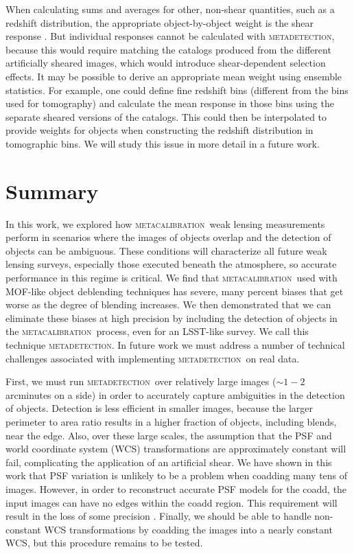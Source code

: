 \documentclass[fleqn,useAMS,usenatbib]{mnras}
\newcommand{\mcal}{\textsc{metacalibration}}
\newcommand{\mdet}{\textsc{metadetection}}
\begin{document}
When calculating sums and averages for other, non-shear quantities, such as a
redshift distribution, the appropriate object-by-object weight is the shear
response \citep{SheldonMcal2017}.  But individual responses cannot be
calculated with \mdet, because this would require matching the catalogs
produced from the different artificially sheared images, which would introduce
shear-dependent selection effects.  It may be possible to derive an appropriate
mean weight using ensemble statistics.  For example, one could define fine
redshift bins (different from the bins used for tomography) and calculate the
mean response in those bins using the separate sheared versions of the
catalogs. This could then be interpolated to provide weights for objects when
constructing the redshift distribution in tomographic bins.  We will study this
issue in more detail in a future work.


\section{Summary}\label{sec:conc}

In this work, we explored how \mcal\ weak lensing measurements perform in
scenarios where the images of objects overlap and the detection of objects can
be ambiguous. These conditions will characterize all future weak lensing
surveys, especially those executed beneath the atmosphere, so accurate
performance in this regime is critical. We find that \mcal\ used with MOF-like
object deblending techniques has severe, many percent biases that get worse as
the degree of blending increases. We then demonstrated that we can eliminate
these biases at high precision by including the detection of objects in the
\mcal\ process, even for an LSST-like survey. We call this technique \mdet.
In future work we must address a number of technical challenges associated
with implementing \mdet\ on real data.

First, we must run \mdet\ over relatively large images ($\sim1-2$ arcminutes on
a side) in order to accurately capture ambiguities in the detection of objects.
Detection is less efficient in smaller images, because the larger perimeter to
area ratio results in a higher fraction of objects, including blends, near the
edge.  Also, over these large scales, the assumption that the PSF and world
coordinate system (WCS) transformations are approximately constant will fail,
complicating the application of an artificial shear. We have shown in this work
that PSF variation is unlikely to be a problem when coadding many tens of
images. However, in order to reconstruct accurate PSF models for the coadd, the
input images can have no edges within the coadd region. This requirement will
result in the loss of some precision \citep{ArmstrongCoadd}. Finally, we should
be able to handle non-constant WCS transformations by coadding the images into
a nearly constant WCS, but this procedure remains to be tested.
\end{document}

